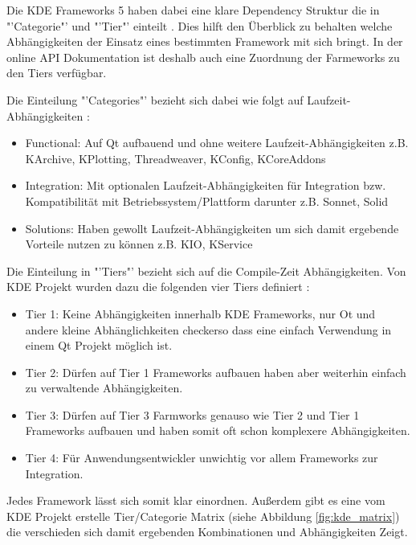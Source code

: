 Die KDE Frameworks 5 haben dabei eine klare Dependency Struktur die in "'Categorie"' und "'Tier"' einteilt \cite{KDEFramework5}. Dies hilft den Überblick zu behalten welche Abhängigkeiten der Einsatz eines bestimmten Framework mit sich bringt. In der online API Dokumentation ist deshalb auch eine Zuordnung der Farmeworks zu den Tiers verfügbar.

Die Einteilung "'Categories"' bezieht sich dabei wie folgt auf Laufzeit-Abhängigkeiten \cite{KDEFramework5}:
\begin{itemize}
\setlength\itemsep{0em}
\item Functional: Auf Qt aufbauend und ohne weitere Laufzeit-Abhängigkeiten z.B. KArchive, KPlotting, Threadweaver, KConfig, KCoreAddons

\item Integration: Mit optionalen Laufzeit-Abhängigkeiten für Integration bzw. Kompatibilität mit Betriebssystem/Plattform darunter z.B. Sonnet, Solid

\item Solutions: Haben gewollt Laufzeit-Abhängigkeiten um sich damit ergebende Vorteile nutzen zu können z.B. KIO, KService
\end{itemize}

Die Einteilung in "'Tiers"' bezieht sich auf die Compile-Zeit Abhängigkeiten. Von KDE Projekt wurden dazu die folgenden vier Tiers definiert \cite{KDEFramework5}:
\begin{itemize}
\setlength\itemsep{0em}
\item Tier 1: Keine Abhängigkeiten innerhalb KDE Frameworks, nur Ot und andere kleine Abhänglichkeiten  checkerso dass eine einfach Verwendung in einem Qt Projekt möglich ist. 

\item Tier 2: Dürfen auf Tier 1 Frameworks aufbauen haben aber weiterhin einfach zu verwaltende Abhängigkeiten.

\item Tier 3: Dürfen auf Tier 3 Farmworks genauso wie Tier 2 und Tier 1 Frameworks aufbauen und haben somit oft schon komplexere Abhängigkeiten.

\item Tier 4: Für Anwendungsentwickler unwichtig vor allem Frameworks zur Integration. 
\end{itemize}

Jedes Framework lässt sich somit klar einordnen. Außerdem gibt es eine vom KDE Projekt erstelle Tier/Categorie Matrix (siehe Abbildung \ref{fig:kde_matrix}) die verschieden sich damit ergebenden Kombinationen und Abhängigkeiten Zeigt.

